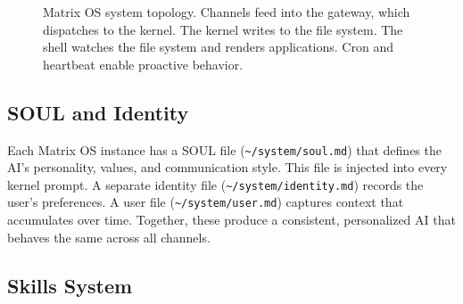 \documentclass[11pt,a4paper]{article}
\begin{document}
\begin{figure}[ht]
\caption{Matrix OS system topology. Channels feed into the gateway, which dispatches to the kernel. The kernel writes to the file system. The shell watches the file system and renders applications. Cron and heartbeat enable proactive behavior.}
\label{fig:architecture}
\end{figure}

\subsection{SOUL and Identity}

Each Matrix OS instance has a SOUL file (\texttt{\textasciitilde/system/soul.md}) that defines the AI's personality, values, and communication style. This file is injected into every kernel prompt. A separate identity file (\texttt{\textasciitilde/system/identity.md}) records the user's preferences. A user file (\texttt{\textasciitilde/system/user.md}) captures context that accumulates over time. Together, these produce a consistent, personalized AI that behaves the same across all channels.

\subsection{Skills System}
\end{document}
